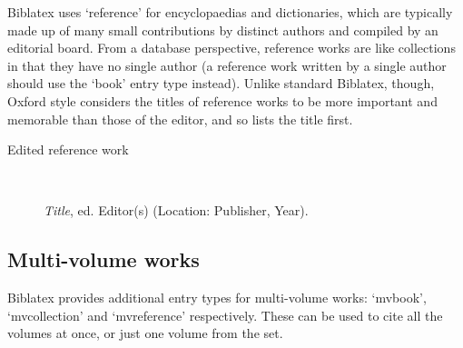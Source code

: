\documentclass[extrafontsizes,11pt,a4paper,oneside]{memoir}
\newcommand*{\lit}[1]{\textsf{#1}}
\newcommand*{\code}[1]{`\textsf{#1}'}
\begin{document}
    Biblatex uses \code{reference} for encyclopaedias and dictionaries, which are typically made up of many small contributions by distinct authors and compiled by an editorial board. From a database perspective, reference works are like collections in that they have no single author (a reference work written by a single author should use the \code{book} entry type instead). Unlike standard Biblatex, though, Oxford style considers the titles of reference works to be more important and memorable than those of the editor, and so lists the title first.
    
    \begin{description}
        \item[Edited reference work]~\par
        \emph{Title}, \lit{ed.} Editor(s) (Location: Publisher, Year).
        \\
    \end{description}
    
    \subsection{Multi-volume works}
    
    Biblatex provides additional entry types for multi-volume works: \code{mvbook}, \code{mvcollection} and \code{mvreference} respectively. These can be used to cite all the volumes at once, or just one volume from the set.
    
\end{document}
